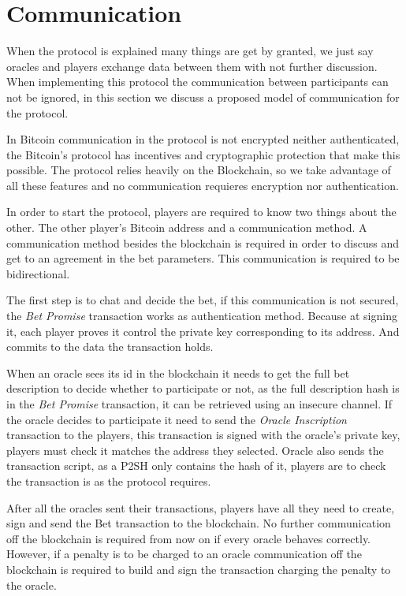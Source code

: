 \section{Communication}

When the protocol is explained many things are get by granted, we just say
  oracles and players exchange data between them with not further
  discussion.
When implementing this protocol the communication between participants can
  not be ignored, in this section we discuss a proposed model of communication
  for the protocol.

In Bitcoin communication in the protocol is not encrypted neither
  authenticated, the Bitcoin's protocol has incentives and cryptographic
  protection that make this possible.
The protocol relies heavily on the Blockchain, so we take advantage of all these
  features and no communication requieres encryption nor authentication.

In order to start the protocol, players are required to know two things about
the other. The other player's Bitcoin address and a communication method.
A communication method besides the blockchain is required in order to discuss
  and get to an agreement in the bet parameters.
This communication is required to be bidirectional.

The first step is to chat and decide the bet, if this communication is not
  secured, the \textit{Bet Promise} transaction works as authentication method.
Because at signing it, each player proves it control the private key
  corresponding to its address.
And commits to the data the transaction holds.

When an oracle sees its id in the blockchain it needs to get the full bet
  description to decide whether to participate or not, as the full description
  hash is in the \textit{Bet Promise} transaction, it can be retrieved using an
  insecure channel.
If the oracle decides to participate it need to send the \textit{Oracle
  Inscription} transaction to the players, this transaction is signed with the
  oracle's private key, players must check it matches the address they selected.
Oracle also sends the transaction script, as a P2SH only contains the hash of
  it, players are to check the transaction is as the protocol requires.

After all the oracles sent their transactions, players have all they need
  to create, sign and send the Bet transaction to the blockchain.
No further communication off the blockchain is required from now on if every
  oracle behaves correctly.
However, if a penalty is to be charged to an oracle  communication off the blockchain is required to
  build and sign the transaction charging the penalty to the oracle.

